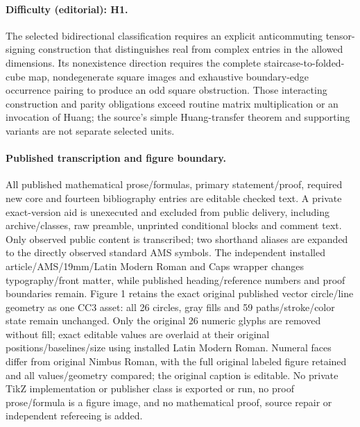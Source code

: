 \documentclass[11pt]{article}
\begin{document}
\paragraph{Difficulty (editorial): H1.} The selected bidirectional classification requires an explicit anticommuting tensor-signing construction that distinguishes real from complex entries in the allowed dimensions. Its nonexistence direction requires the complete staircase-to-folded-cube map, nondegenerate square images and exhaustive boundary-edge occurrence pairing to produce an odd square obstruction. Those interacting construction and parity obligations exceed routine matrix multiplication or an invocation of Huang; the source’s simple Huang-transfer theorem and supporting variants are not separate selected units.
\paragraph{Published transcription and figure boundary.} All published mathematical prose/formulas, primary statement/proof, required new core and fourteen bibliography entries are editable checked text. A private exact-version aid is unexecuted and excluded from public delivery, including archive/classes, raw preamble, unprinted conditional blocks and comment text. Only observed public content is transcribed; two shorthand aliases are expanded to the directly observed standard AMS symbols. The independent installed article/AMS/19mm/Latin Modern Roman and Caps wrapper changes typography/front matter, while published heading/reference numbers and proof boundaries remain. Figure 1 retains the exact original published vector circle/line geometry as one CC3 asset: all 26 circles, gray fills and 59 paths/stroke/color state remain unchanged. Only the original 26 numeric glyphs are removed without fill; exact editable values are overlaid at their original positions/baselines/size using installed Latin Modern Roman. Numeral faces differ from original Nimbus Roman, with the full original labeled figure retained and all values/geometry compared; the original caption is editable. No private TikZ implementation or publisher class is exported or run, no proof prose/formula is a figure image, and no mathematical proof, source repair or independent refereeing is added.
\clearpage
\end{document}
